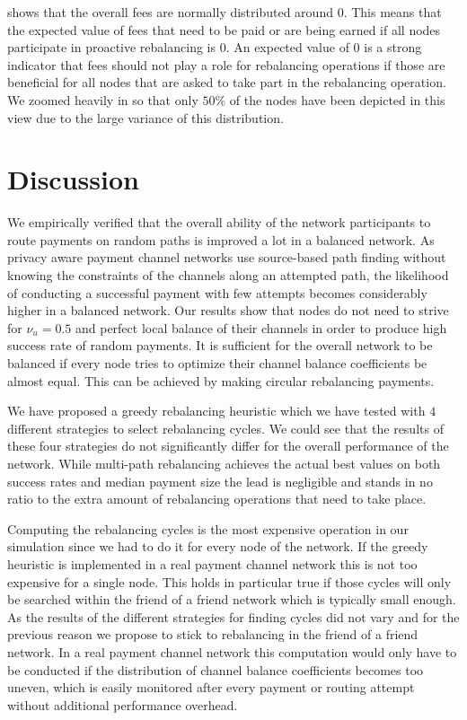 \documentclass[conference]{IEEEtran}
\begin{document}
 shows that the overall fees are normally distributed around $0$.
This means that the expected value of fees that need to be paid or are being earned if all nodes participate in proactive rebalancing is $0$.
An expected value of $0$ is a strong indicator that fees should not play a role for rebalancing operations if those are beneficial for all nodes that are asked to take part in the rebalancing operation.
We zoomed heavily in so that only $50\%$ of the nodes have been depicted in this view due to the large variance of this distribution.



\section{Discussion}
\label{sec:conclusion}

We empirically verified that the overall ability of the network participants to route payments on random paths is improved a lot in a balanced network. 
As privacy aware payment channel networks use source-based path finding without knowing the constraints of the channels along an attempted path, the likelihood of conducting a successful payment with few attempts becomes considerably higher in a balanced network.
Our results show that nodes do not need to strive for $\nu_u = 0.5$ and perfect local balance of their channels in order to produce high success rate of random payments.
It is sufficient for the overall network to be balanced if every node tries to optimize their channel balance coefficients be almost equal. 
This can be achieved by making circular rebalancing payments.

We have proposed a greedy rebalancing heuristic which we have tested with $4$ different strategies to select rebalancing cycles.
We could see that the results of these four strategies do not significantly differ for the overall performance of the network.
While multi-path rebalancing achieves the actual best values on both success rates and median payment size the lead is negligible and stands in no ratio to the extra amount of rebalancing operations that need to take place.

Computing the rebalancing cycles is the most expensive operation in our simulation since we had to do it for every node of the network.
If the greedy heuristic is implemented in a real payment channel network this is not too expensive for a single node.
This holds in particular true if those cycles will only be searched within the friend of a friend network which is typically small enough.
As the results of the different strategies for finding cycles did not vary and for the previous reason we propose to stick to rebalancing in the friend of a friend network.
In a real payment channel network this computation would only have to be conducted 
if the distribution of channel balance coefficients becomes too uneven,
which is easily monitored after every payment or routing attempt without additional performance overhead.
\end{document}
